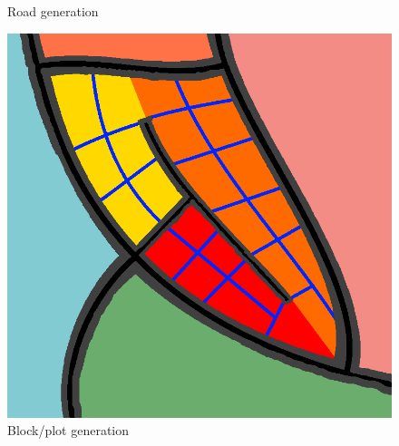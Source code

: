 \begin{figure}[H]
    \caption{Road generation}\label{fig:awesome_image2}
  \endminipage\hfill
    \includegraphics[width=\linewidth]{figure/method_generation_3.png}
    \caption{Block/plot generation}\label{fig:awesome_image3}
  \endminipage
\end{figure}
  








